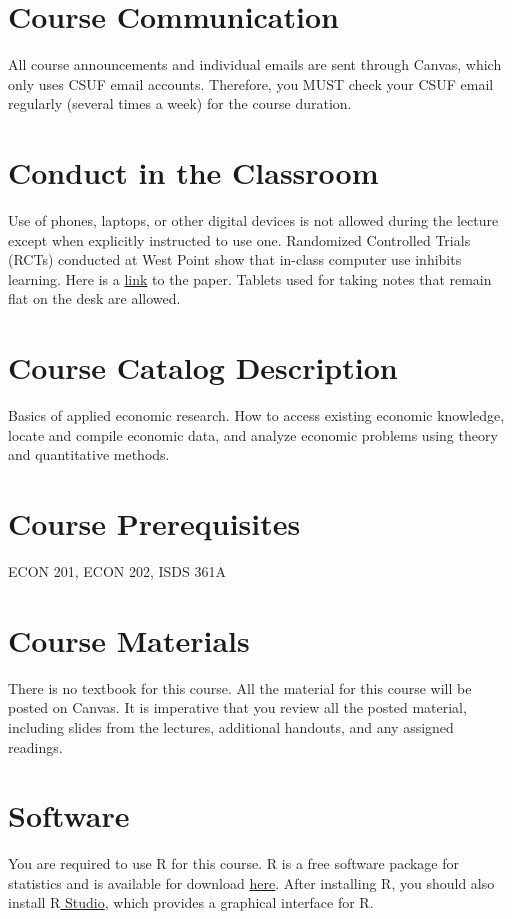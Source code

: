 \documentclass{syllabus}
\begin{document}
\section*{Course Communication}
All course announcements and individual emails are sent through Canvas, which only uses CSUF email accounts. Therefore, you MUST check your CSUF email regularly (several times a week) for the course duration.

\section*{Conduct in the Classroom}
Use of phones, laptops, or other digital devices is not allowed during the lecture except when explicitly instructed to use one. Randomized Controlled Trials (RCTs) conducted at West Point show that in-class computer use inhibits learning. Here is a \href{https://oema.army.mil/pub/2017_Carter_Greenberg_Walker_Computer_Usage_RCT_USMA.pdf}{link} to the paper. Tablets used for taking notes that remain flat on the desk are allowed.

\section*{Course Catalog Description}
Basics of applied economic research. How to access existing economic knowledge, locate and compile economic data, and analyze economic problems using theory and quantitative methods.

\section*{Course Prerequisites}
ECON 201, ECON 202, ISDS 361A

\section*{Course Materials}
There is no textbook for this course. All the material for this course will be posted on Canvas. It is imperative that you review all the posted material, including slides from the lectures, additional handouts, and any assigned readings. 

\section*{Software}
You are required to use $\mathrm{R}$ for this course. $\mathrm{R}$ is a free software package for statistics and is available for download \href{https://www.r-project.org}{here}. After installing $\mathrm{R}$, you should also install \href{https://posit.co/download/rstudio-desktop/}{$\mathrm{R}$ Studio}, which provides a graphical interface for $\mathrm{R}$.
\end{document}
